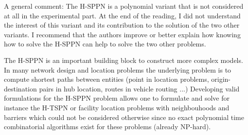 \documentclass{article}
\newenvironment{reviewer}{\setcounter{pointcounter}{1}}{}
\newcommand{\point}{\text{{\selectfont \thepointcounter} \stepcounter{pointcounter}}}
\begin{document}
\begin{reviewer}
		\begin{itshape}
			A general comment: The H-SPPN is a polynomial variant that is not considered at all in the experimental part. At the end of the reading, I did not understand the interest of this variant and its contribution to the solution of the two other variants. I recommend that the authors improve or better explain how knowing how to solve the H-SPPN can help to solve the two other problems.
		\end{itshape}
		
		\begin{tcolorbox}[breakable,enhanced,coltitle=black,colback=green!5!white,colframe=green!75!black,title=\textbf{Answer R2.\point},borderline={1pt}{0pt}{black},boxrule=0pt]
			The H-SPPN is an important building block to construct more complex models. In many network design and location problems the underlying problem is to compute shortest paths between entities (point in location problems, origin-destination pairs in hub location, routes in vehicle routing ...)
 Developing valid formulations for the H-SPPN problem allows one to formulate and solve for instance the H-TSPN or facility location problems with neighbouhoods and barriers which could not be considered otherwise since no exact polynomial time combinatorial algorithms exist for these problems (already NP-hard).
 		\end{tcolorbox}
		
	\end{reviewer}
	
	
\end{document}
